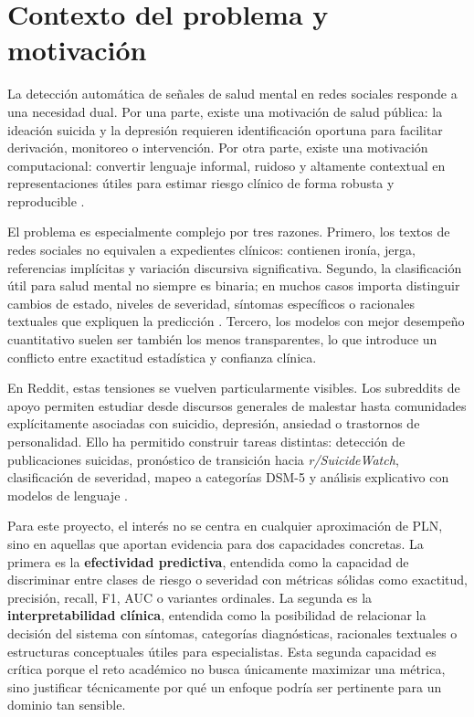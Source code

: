 \section{Contexto del problema y motivación}

La detección automática de señales de salud mental en redes sociales responde a una necesidad dual. Por una parte, existe una motivación de salud pública: la ideación suicida y la depresión requieren identificación oportuna para facilitar derivación, monitoreo o intervención. Por otra parte, existe una motivación computacional: convertir lenguaje informal, ruidoso y altamente contextual en representaciones útiles para estimar riesgo clínico de forma robusta y reproducible \citep{abdulsalam2024suicidal, montejo2024survey}.

El problema es especialmente complejo por tres razones. Primero, los textos de redes sociales no equivalen a expedientes clínicos: contienen ironía, jerga, referencias implícitas y variación discursiva significativa. Segundo, la clasificación útil para salud mental no siempre es binaria; en muchos casos importa distinguir cambios de estado, niveles de severidad, síntomas específicos o racionales textuales que expliquen la predicción \citep{dechoudhury2016shifts, gaur2019severity}. Tercero, los modelos con mejor desempeño cuantitativo suelen ser también los menos transparentes, lo que introduce un conflicto entre exactitud estadística y confianza clínica.

En Reddit, estas tensiones se vuelven particularmente visibles. Los subreddits de apoyo permiten estudiar desde discursos generales de malestar hasta comunidades explícitamente asociadas con suicidio, depresión, ansiedad o trastornos de personalidad. Ello ha permitido construir tareas distintas: detección de publicaciones suicidas, pronóstico de transición hacia \textit{r/SuicideWatch}, clasificación de severidad, mapeo a categorías DSM-5 y análisis explicativo con modelos de lenguaje \citep{gaur2018dsm5, gaur2019severity, bauer2024llm}.

Para este proyecto, el interés no se centra en cualquier aproximación de PLN, sino en aquellas que aportan evidencia para dos capacidades concretas. La primera es la \textbf{efectividad predictiva}, entendida como la capacidad de discriminar entre clases de riesgo o severidad con métricas sólidas como exactitud, precisión, recall, F1, AUC o variantes ordinales. La segunda es la \textbf{interpretabilidad clínica}, entendida como la posibilidad de relacionar la decisión del sistema con síntomas, categorías diagnósticas, racionales textuales o estructuras conceptuales útiles para especialistas. Esta segunda capacidad es crítica porque el reto académico no busca únicamente maximizar una métrica, sino justificar técnicamente por qué un enfoque podría ser pertinente para un dominio tan sensible.
